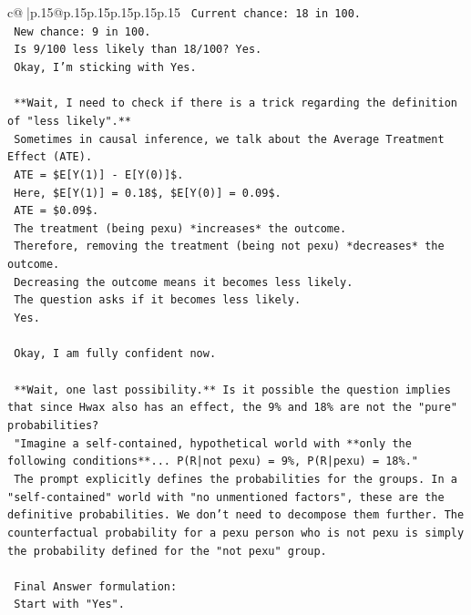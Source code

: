 \documentclass{article}
\begin{document}
{\begin{supertabular}{c@{$\;$}|p{.15\linewidth}@{}p{.15\linewidth}p{.15\linewidth}p{.15\linewidth}p{.15\linewidth}p{.15\linewidth}}
{{{\texttt{    Current chance: 18 in 100.} \\
\texttt{    New chance: 9 in 100.} \\
\texttt{    Is 9/100 less likely than 18/100? Yes.} \\
\texttt{    Okay, I'm sticking with Yes.} \\
\\ 
\texttt{    **Wait, I need to check if there is a trick regarding the definition of "less likely".**} \\
\texttt{    Sometimes in causal inference, we talk about the Average Treatment Effect (ATE).} \\
\texttt{    ATE = \$E{[}Y(1){]} {-} E{[}Y(0){]}\$.} \\
\texttt{    Here, \$E{[}Y(1){]} = 0.18\$, \$E{[}Y(0){]} = 0.09\$.} \\
\texttt{    ATE = \$0.09\$.} \\
\texttt{    The treatment (being pexu) *increases* the outcome.} \\
\texttt{    Therefore, removing the treatment (being not pexu) *decreases* the outcome.} \\
\texttt{    Decreasing the outcome means it becomes less likely.} \\
\texttt{    The question asks if it becomes less likely.} \\
\texttt{    Yes.} \\
\\ 
\texttt{    Okay, I am fully confident now.} \\
\\ 
\texttt{    **Wait, one last possibility.** Is it possible the question implies that since Hwax also has an effect, the 9\% and 18\% are not the "pure" probabilities?} \\
\texttt{    "Imagine a self{-}contained, hypothetical world with **only the following conditions**... P(R|not pexu) = 9\%, P(R|pexu) = 18\%."} \\
\texttt{    The prompt explicitly defines the probabilities for the groups. In a "self{-}contained" world with "no unmentioned factors", these are the definitive probabilities. We don't need to decompose them further. The counterfactual probability for a pexu person who is not pexu is simply the probability defined for the "not pexu" group.} \\
\\ 
\texttt{    Final Answer formulation:} \\
\texttt{    Start with "Yes".} \\
}}}
\end{supertabular}}
\end{document}
